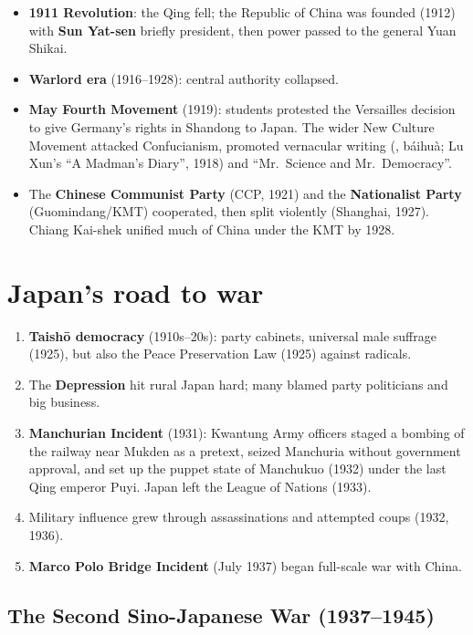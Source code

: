 \begin{itemize}
  \item \textbf{1911 Revolution}: the Qing fell; the Republic of China was founded
        (1912) with \textbf{Sun Yat-sen} briefly president, then power passed to the
        general Yuan Shikai.
  \item \textbf{Warlord era} (1916--1928): central authority collapsed.
  \item \textbf{May Fourth Movement} (1919): students protested the Versailles decision to
        give Germany's rights in Shandong to Japan. The wider New Culture Movement attacked
        Confucianism, promoted vernacular writing (, báihuà; Lu Xun's ``A Madman's
        Diary'', 1918) and ``Mr.\ Science and Mr.\ Democracy''.
  \item The \textbf{Chinese Communist Party} (CCP, 1921) and the \textbf{Nationalist Party}
        (Guomindang/KMT) cooperated, then split violently (Shanghai, 1927). Chiang Kai-shek
        unified much of China under the KMT by 1928.
\end{itemize}

\section{Japan's road to war}

\begin{enumerate}
  \item \textbf{Taishō democracy} (1910s--20s): party cabinets, universal male suffrage
        (1925), but also the Peace Preservation Law (1925) against radicals.
  \item The \textbf{Depression} hit rural Japan hard; many blamed party politicians and
        big business.
  \item \textbf{Manchurian Incident} (1931): Kwantung Army officers staged a bombing of the
        railway near Mukden as a pretext, seized Manchuria without government approval, and
        set up the puppet state of Manchukuo (1932) under the last Qing emperor Puyi. Japan
        left the League of Nations (1933).
  \item Military influence grew through assassinations and attempted coups (1932, 1936).
  \item \textbf{Marco Polo Bridge Incident} (July 1937) began full-scale war with China.
\end{enumerate}

\subsection{The Second Sino-Japanese War (1937--1945)}

